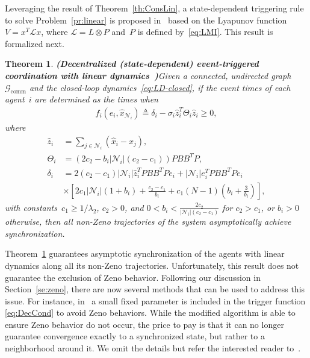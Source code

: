 \documentclass{autart}
\newtheorem{theorem}{Theorem}[section]
\newcommand{\GG}{{\mathcal{G}}}
\newcommand{\NN}{{\mathcal{N}}}
\newcommand{\LL}{{\mathcal{L}}}
\newcommand{\commgraph}{\GG_\text{comm}}
\renewcommand{\hat}{\widehat}
\newcommand{\longthmtitle}[1]{\mbox{}\textup{\textbf{(#1)}}}
\begin{document}
Leveraging the result of Theorem~\ref{th:ConsLin}, a state-dependent
triggering rule to solve Problem~\ref{pr:linear} is proposed
in~\citep{EG-YC-DWC:14} based on the Lyapunov
function~$V = x^T \LL x$, where $\LL = L \otimes P$ and~$P$ is defined
by~\eqref{eq:LMI}.  This result is formalized next.

\begin{theorem}\longthmtitle{Decentralized (state-dependent)
    event-triggered 
    coordination with linear dynamics~\citep{EG-YC-DWC:14}}\label{th:Decent}
  Given {a connected, undirected graph~$\commgraph$ and} the
  closed-loop dynamics~\eqref{eq:LD-closed}, if the event times of
  each agent~$i$ are determined as the times when
  \begin{align}\label{eq:DecCond}
    f_i(e_i,\hat{x}_{\NN_i}) \triangleq \delta_i -
    \sigma_i \hat{z}_i^T \Theta_i \hat{z}_i \geq 0,
  \end{align}
  where
  \begin{align*}
    \hat{z}_i&=\sum_{j\in\mathcal{N}_i}\left(\hat{x}_i-\hat{x}_j\right),
    \\
    \Theta_i& =(2c_2-b_i|\NN_i|(c_2-c_1))PBB^{T}P,
    \\
    \delta_i&=2(c_2-c_1)|\NN_i|\hat{z}_i^TPBB^TPe_i + |\NN_i|
    e^T_iPBB^TPe_i
    \\
    &\times \left[2c_1|\NN_i|(1+b_i)+\frac{c_2-c_1}{b_i}\right.
    +\left.c_1(N-1)\left(b_i+\frac{3}{b_i}\right)\right],
  \end{align*}
  with constants~$c_1\geq 1/\lambda_2$, $c_2>0$, and
  $0<b_i<\frac{2c_2}{|\mathcal{N}_i|(c_2-c_1)}$ for $c_2>c_1$, or $b_i > 0$
  otherwise, then all non-Zeno trajectories of the system
  asymptotically achieve synchronization.
\end{theorem}

Theorem~\ref{th:Decent} guarantees asymptotic synchronization of the
agents with linear dynamics along all its non-Zeno
trajectories. Unfortunately, this result does not guarantee the
exclusion of Zeno behavior. Following our discussion in
Section~\ref{se:zeno}, there are now several methods that can be used
to address this issue. For instance, in~\citep{EG-YC-DWC:14} a small
fixed parameter is included in the trigger function \eqref{eq:DecCond}
to avoid Zeno behaviors.  While the modified algorithm is able to
ensure Zeno behavior do not occur, the price to pay is that it can no
longer guarantee convergence exactly to a synchronized state, but
rather to a neighborhood around it. We omit the details but refer the
interested reader to~\citep{EG-YC-DWC:14}.
\end{document}
